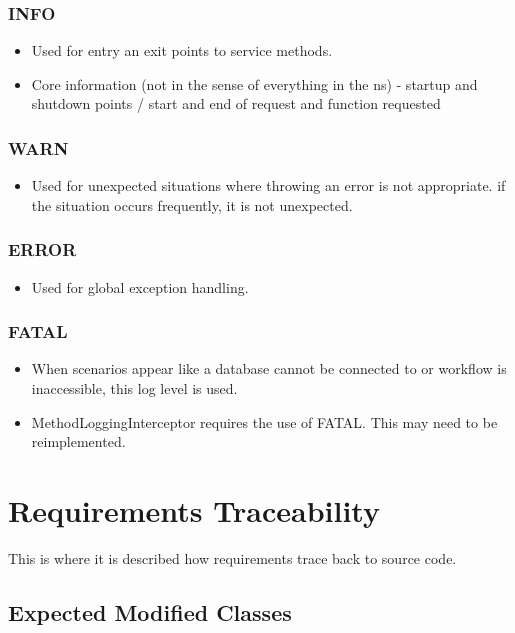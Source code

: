 \documentclass[12pt]{report}
\begin{document}
\subsubsection{INFO}
\begin{itemize}
\item Used for entry an exit points to service methods. 
\item Core information (not in the sense of everything in the ns) - startup and shutdown points / start and end of request and function requested
\end{itemize}

\subsubsection{WARN}
\begin{itemize}
  \item Used for unexpected situations where throwing an error is not appropriate. if the situation occurs frequently, it is not unexpected.
\end{itemize}

\subsubsection{ERROR}
\begin{itemize}
  \item Used for global exception handling.
\end{itemize}

\subsubsection{FATAL}
\begin{itemize}
  \item When scenarios appear like a database cannot be connected to or workflow is inaccessible, this log level is used.
  \item MethodLoggingInterceptor requires the use of FATAL. This may need to be reimplemented.
\end{itemize}

\section{Requirements Traceability}
This is where it is described how requirements trace back to source code. 

\subsection{Expected Modified Classes}
\end{document}
